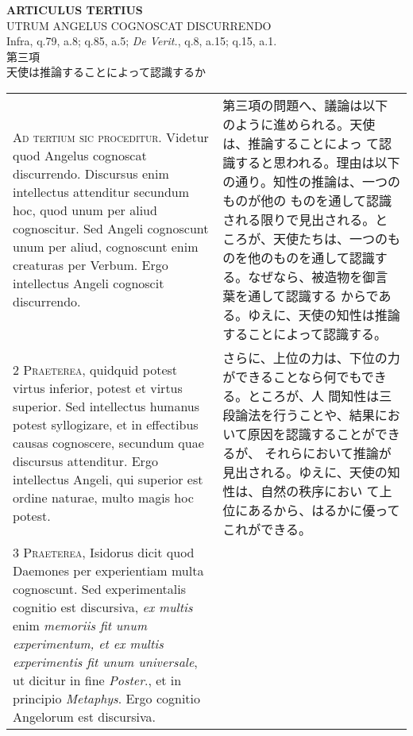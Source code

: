 \documentclass[10pt]{jsarticle} %
\begin{document}
\newpage

\begin{center}
{\Large {\bf ARTICULUS TERTIUS}}\\
{\large UTRUM ANGELUS COGNOSCAT DISCURRENDO}\\
{\footnotesize Infra, q.79, a.8; q.85, a.5; {\itshape De Verit.}, q.8,
a.15; q.15, a.1.}\\
{\Large 第三項\\天使は推論することによって認識するか}
\end{center}

\begin{longtable}{p{21em}p{21em}}



{\Huge A}{\scshape d tertium sic proceditur}. Videtur quod Angelus
cognoscat discurrendo. Discursus enim intellectus attenditur secundum
hoc, quod unum per aliud cognoscitur. Sed Angeli cognoscunt unum per
aliud, cognoscunt enim creaturas per Verbum. Ergo intellectus Angeli
cognoscit discurrendo.


&

第三項の問題へ、議論は以下のように進められる。天使は、推論することによっ
て認識すると思われる。理由は以下の通り。知性の推論は、一つのものが他の
ものを通して認識される限りで見出される。ところが、天使たちは、一つのも
のを他のものを通して認識する。なぜなら、被造物を御言葉を通して認識する
からである。ゆえに、天使の知性は推論することによって認識する。


\\



{\scshape 2 Praeterea}, quidquid potest virtus inferior,
potest et virtus superior. Sed intellectus humanus potest syllogizare,
et in effectibus causas cognoscere, secundum quae discursus
attenditur. Ergo intellectus Angeli, qui superior est ordine naturae,
multo magis hoc potest.


&

さらに、上位の力は、下位の力ができることなら何でもできる。ところが、人
間知性は三段論法を行うことや、結果において原因を認識することができるが、
それらにおいて推論が見出される。ゆえに、天使の知性は、自然の秩序におい
て上位にあるから、はるかに優ってこれができる。


\\



{\scshape 3 Praeterea}, Isidorus dicit quod Daemones per experientiam
multa cognoscunt. Sed experimentalis cognitio est discursiva,
{\itshape ex multis} enim {\itshape memoriis fit unum experimentum, et
ex multis experimentis fit unum universale}, ut dicitur in fine
{\itshape Poster}., et in principio {\itshape Metaphys}. Ergo cognitio
Angelorum est discursiva.



\end{longtable}
\end{document}
